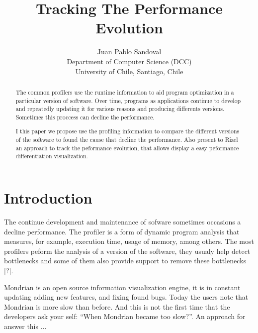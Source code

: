 \documentclass{sig-alternate}
\newcommand{\Title}{Tracking The Performance Evolution}
\newcommand{\TitleShort}{\Title}
\newcommand{\Authors}{Juan Pablo Sandoval}
\newcommand{\AuthorsShort}{J. P. Sandoval}
\newcommand{\seclabel}[1]{\label{sec:#1}}
\begin{document}
\title{\Title}

\author{\Authors\\[3mm]
Department of Computer Science (DCC)\\ University of Chile, Santiago, Chile\\[1 ex]
} 

\maketitle


\begin{abstract}

The common profilers use the runtime information to aid program optimization in a particular version of software.
Over time, programs as applications continue to develop and repeatedly updating it for various reasons and producing differents versions. Sometimes this proccess can decline the performance. 

I this paper we propose use the profiling information to compare the different versions of the software to found the cause that decline the performance. Also present to Rizel an approach to track the peformance evolution, that allows display a easy peformance differentiation visualization.

\end{abstract}

\section{Introduction}\seclabel{problem}

The continue development and maintenance of sofware sometimes occasions a decline performance. The profiler is a form of dynamic program analysis that measures, for example, execution time, usage of memory, among others. The most profilers peform the analysis of a version of the software, they usualy help detect bottlenecks and some of them also provide support to remove these bottlenecks [?].


Mondrian is an open source information visualization engine, it is in constant updating adding new features, and fixing found bugs. Today the users note that Mondrian is more slow than before. And this is not the first time that the developers ask your self: ``When Mondrian became too slow?''. An approach for answer this ...
\end{document}
